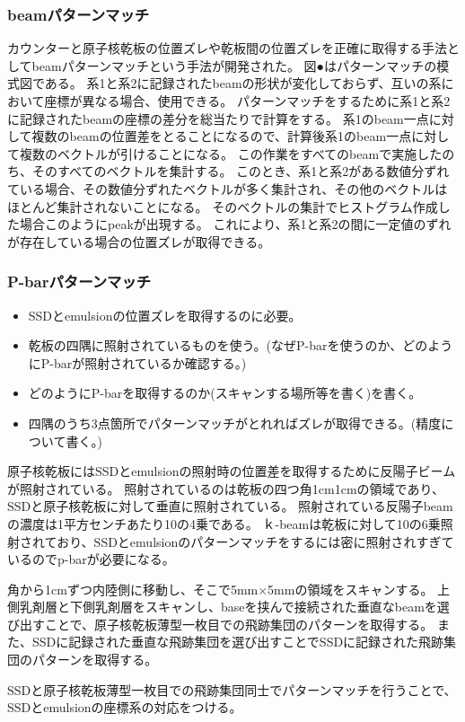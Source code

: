 \documentclass[12pt,a4paper]{jarticle}
\begin{document}
\subsubsection{beamパターンマッチ}
カウンターと原子核乾板の位置ズレや乾板間の位置ズレを正確に取得する手法としてbeamパターンマッチという手法が開発された。
図●はパターンマッチの模式図である。
系1と系2に記録されたbeamの形状が変化しておらず、互いの系において座標が異なる場合、使用できる。
パターンマッチをするために系1と系2に記録されたbeamの座標の差分を総当たりで計算をする。
系1のbeam一点に対して複数のbeamの位置差をとることになるので、計算後系1のbeam一点に対して複数のベクトルが引けることになる。
この作業をすべてのbeamで実施したのち、そのすべてのベクトルを集計する。
このとき、系1と系2がある数値分ずれている場合、その数値分ずれたベクトルが多く集計され、その他のベクトルはほとんど集計されないことになる。
そのベクトルの集計でヒストグラム作成した場合このようにpeakが出現する。
これにより、系1と系2の間に一定値のずれが存在している場合の位置ズレが取得できる。
\subsubsection{P-barパターンマッチ}
\begin{itemize}
    \item SSDとemulsionの位置ズレを取得するのに必要。
    \item 乾板の四隅に照射されているものを使う。(なぜP-barを使うのか、どのようにP-barが照射されているか確認する。)
    \item どのようにP-barを取得するのか(スキャンする場所等を書く)を書く。
    \item 四隅のうち3点箇所でパターンマッチがとれればズレが取得できる。(精度について書く。)
\end{itemize}
原子核乾板にはSSDとemulsionの照射時の位置差を取得するために反陽子ビームが照射されている。
照射されているのは乾板の四つ角1cm1cmの領域であり、SSDと原子核乾板に対して垂直に照射されている。
照射されている反陽子beamの濃度は1平方センチあたり10の4乗である。
ｋ-beamは乾板に対して10の6乗照射されており、SSDとemulsionのパターンマッチをするには密に照射されすぎているのでp-barが必要になる。
\par
角から1cmずつ内陸側に移動し、そこで5mm×5mmの領域をスキャンする。
上側乳剤層と下側乳剤層をスキャンし、baseを挟んで接続された垂直なbeamを選び出すことで、原子核乾板薄型一枚目での飛跡集団のパターンを取得する。
また、SSDに記録された垂直な飛跡集団を選び出すことでSSDに記録された飛跡集団のパターンを取得する。
\par
SSDと原子核乾板薄型一枚目での飛跡集団同士でパターンマッチを行うことで、SSDとemulsionの座標系の対応をつける。
\end{document}
